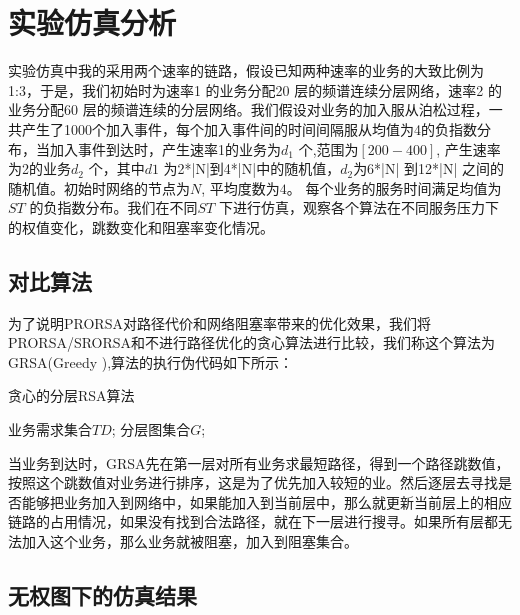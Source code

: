 \section{实验仿真分析}

实验仿真中我的采用两个速率的链路，假设已知两种速率的业务的大致比例为1:3，于是，我们初始时为速率1 的业务分配20 层的频谱连续分层网络，速率2 的业务分配60 层的频谱连续的分层网络。我们假设对业务的加入服从泊松过程，一共产生了1000个加入事件，每个加入事件间的时间间隔服从均值为4的负指数分布，当加入事件到达时，产生速率1的业务为$d_1$ 个,范围为$[200-400]$, 产生速率为2的业务$d_2$ 个，其中$d1$ 为2*|N|到4*|N|中的随机值，$d_2$为6*|N| 到12*|N| 之间的随机值。初始时网络的节点为$N$, 平均度数为$4$。 每个业务的服务时间满足均值为$ST$ 的负指数分布。我们在不同$ST$ 下进行仿真，观察各个算法在不同服务压力下的权值变化，跳数变化和阻塞率变化情况。
\subsection{对比算法}

为了说明PRORSA对路径代价和网络阻塞率带来的优化效果，我们将PRORSA/SRORSA和不进行路径优化的贪心算法进行比较，我们称这个算法为GRSA(Greedy ),算法的执行伪代码如下所示：
\begin{algorithm}[t]
\begin{algorithmic}[1]
\caption{{贪心的分层RSA算法}}
\label{ParaSPC}
\Require
	 业务需求集合$TD$;
     分层图集合$G$;
\EndIf
\EndFor
{}
\EndIf
\EndFor
\EndFor
\EndFor
\end{algorithmic}
\end{algorithm}

当业务到达时，GRSA先在第一层对所有业务求最短路径，得到一个路径跳数值，按照这个跳数值对业务进行排序，这是为了优先加入较短的业。然后逐层去寻找是否能够把业务加入到网络中，如果能加入到当前层中，那么就更新当前层上的相应链路的占用情况，如果没有找到合法路径，就在下一层进行搜寻。如果所有层都无法加入这个业务，那么业务就被阻塞，加入到阻塞集合。
\subsection{无权图下的仿真结果}
